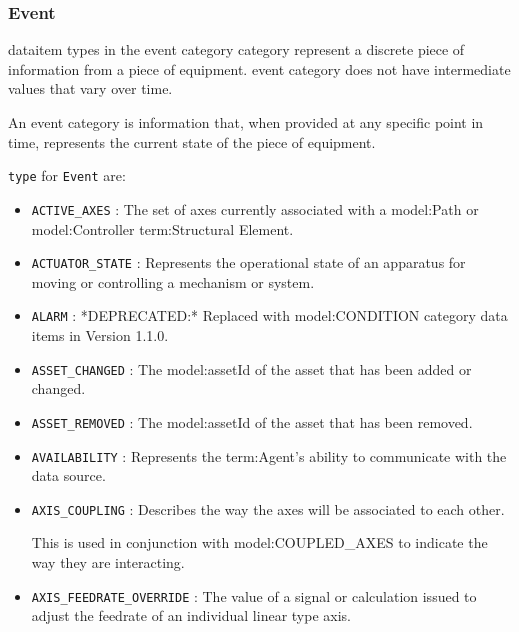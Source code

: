 \FloatBarrier

\subsubsection{Event}
  \label{sec:Event}


\gls{dataitem} types in the \gls{event category} category represent a discrete piece of information from a piece of equipment.  \gls{event category} does not have intermediate values that vary over time.

An \gls{event category} is information that, when provided at any specific point in time, represents the current state of the piece of equipment.


 \texttt{type} for \texttt{Event} are:
\begin{itemize}

\item \texttt{ACTIVE_AXES} : The set of axes currently associated with a {model:Path} or {model:Controller} {term:Structural Element}. 

\item \texttt{ACTUATOR_STATE} : Represents the operational state of an apparatus for moving or controlling a mechanism or system. 

\item \texttt{ALARM} : *DEPRECATED:* Replaced with {model:CONDITION} category data items in Version 1.1.0. 

\item \texttt{ASSET_CHANGED} : The {model:assetId} of the asset that has been added or changed. 

\item \texttt{ASSET_REMOVED} : The {model:assetId} of the asset that has been removed. 

\item \texttt{AVAILABILITY} : Represents the {term:Agent}'s ability to communicate with the data source. 

\item \texttt{AXIS_COUPLING} : Describes the way the axes will be associated to each other. 
  
This is used in conjunction with {model:COUPLED_AXES} to indicate the way they are interacting. 

\item \texttt{AXIS_FEEDRATE_OVERRIDE} : The value of a signal or calculation issued to adjust the feedrate of an individual linear type axis. 


\end{itemize}
